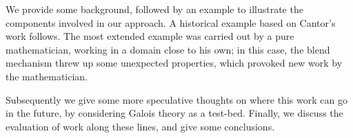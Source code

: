 We provide some background, followed by an example to illustrate the components
involved in our approach. A historical example based on Cantor's work follows.
The most extended example was carried out by a pure mathematician, working
in a domain close to his own;  in this case, the blend mechanism threw up
some unexpected properties, which provoked new work by the mathematician.

Subsequently we give some more speculative thoughts on where this work
can go in the future, by considering Galois theory as a test-bed.
Finally, we discuss the evaluation of work along these lines, and
give some conclusions.



